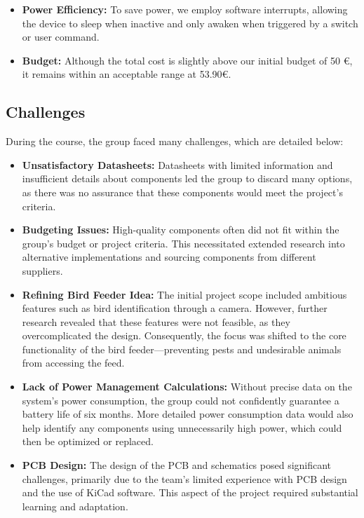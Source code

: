 \documentclass[12pt,a4paper]{article}
\begin{document}
\begin{itemize}
    \item \textbf{Power Efficiency:} To save power, we employ software interrupts, allowing the device to sleep when inactive and only awaken when triggered by a switch or user command.
    
    \item \textbf{Budget:} Although the total cost is slightly above our initial budget of 50 €, it remains within an acceptable range at 53.90€.
\end{itemize}
\subsection{Challenges}

During the course, the group faced many challenges, which are detailed below:

\begin{itemize}
    \item \textbf{Unsatisfactory Datasheets:}
    Datasheets with limited information and insufficient details about components led the group to discard many options, as there was no assurance that these components would meet the project's criteria.
    
    \item \textbf{Budgeting Issues:}
    High-quality components often did not fit within the group's budget or project criteria. This necessitated extended research into alternative implementations and sourcing components from different suppliers.
    
    \item \textbf{Refining Bird Feeder Idea:}
    The initial project scope included ambitious features such as bird identification through a camera. However, further research revealed that these features were not feasible, as they overcomplicated the design. Consequently, the focus was shifted to the core functionality of the bird feeder—preventing pests and undesirable animals from accessing the feed.
    
    \item \textbf{Lack of Power Management Calculations:}
    Without precise data on the system's power consumption, the group could not confidently guarantee a battery life of six months. More detailed power consumption data would also help identify any components using unnecessarily high power, which could then be optimized or replaced.
    
    \item \textbf{PCB Design:}
    The design of the PCB and schematics posed significant challenges, primarily due to the team's limited experience with PCB design and the use of KiCad software. This aspect of the project required substantial learning and adaptation.
\end{itemize}
\end{document}
